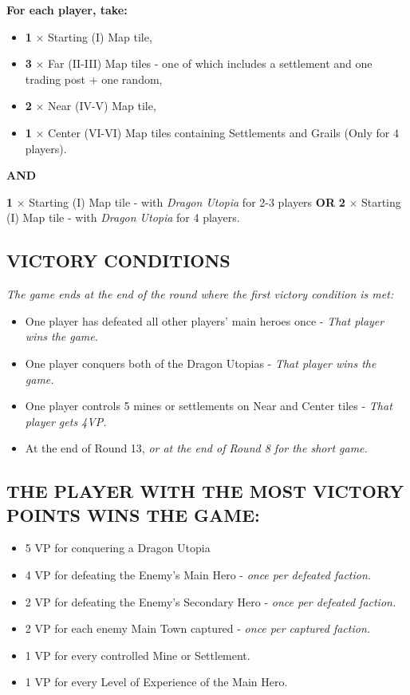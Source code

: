 \begin{multicols*}{2}
\textbf{For each player, take:}
\begin{itemize}
  \item \textbf{1} × Starting (I) Map tile,
  \item \textbf{3} × Far (II-III) Map tiles - one of which includes a settlement and one trading post + one random,
  \item \textbf{2} × Near (IV-V) Map tile,
  \item \textbf{1} × Center (VI-VI) Map tiles containing Settlements and Grails (Only for 4 players).
\end{itemize}
\textbf{AND}

\begin{itemize}
  \textbf{1} × Starting (I) Map tile - with \textit{Dragon Utopia} for 2-3 players \textbf{OR}
  \textbf{2} × Starting (I) Map tile - with \textit{Dragon Utopia} for 4 players.
\end{itemize}

\subsection*{\MakeUppercase{Victory Conditions}}
\textit{The game ends at the end of the round where the first victory condition is met:}
\begin{itemize}
  \item One player has defeated all other players’ main heroes once - \textit{That player wins the game.}
  \item One player conquers both of the Dragon Utopias - \textit{That player wins the game.}
  \item One player controls 5 mines or settlements on Near and Center tiles - \textit{That player gets 4VP.}
  \item At the end of Round 13, \textit{or at the end of Round 8 for the short game.}
\end{itemize}

\subsection*{\MakeUppercase{The player with the most Victory Points wins the game:}}
\begin{itemize}
  \item 5 VP for conquering a Dragon Utopia
  \item 4 VP for defeating the Enemy’s Main Hero - \textit{once per defeated faction.}
  \item 2 VP for defeating the Enemy’s Secondary Hero - \textit{once per defeated faction.}
  \item 2 VP for each enemy Main Town captured - \textit{once per captured faction.}
  \item 1 VP for every controlled Mine or Settlement.
  \item 1 VP for every Level of Experience of the Main Hero.
\end{itemize}


\end{multicols*}

